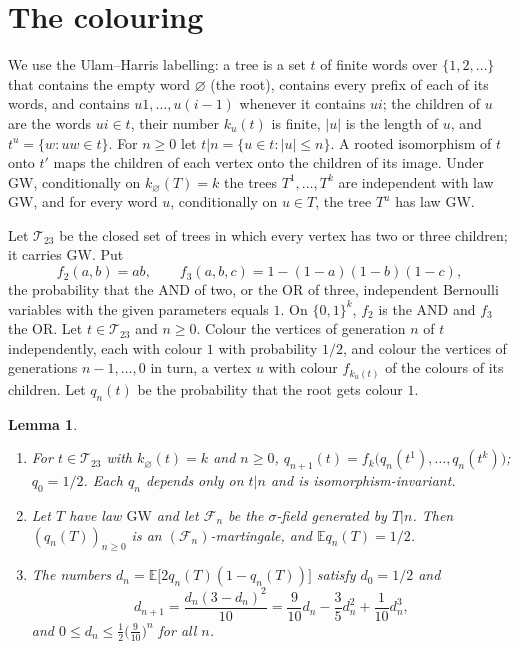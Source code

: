 \documentclass[11pt]{amsart}
\newtheorem{lemma}{Lemma}
\theoremstyle{remark}
\numberwithin{equation}{section}
\newcommand{\E}{\mathbb E}
\newcommand{\T}{\mathcal T}
\newcommand{\GW}{\mathrm{GW}}
\begin{document}
\section{The colouring}\label{sec:colour}

We use the Ulam--Harris labelling: a tree is a set $t$ of finite words over $\{1,2,\dots\}$ that contains the empty word $\varnothing$ (the root), contains every prefix of each of its words, and contains $u1,\dots,u(i-1)$ whenever it contains $ui$; the children of $u$ are the words $ui\in t$, their number $k_u(t)$ is finite, $|u|$ is the length of $u$, and $t^u=\{w:uw\in t\}$. For $n\ge0$ let $t|n=\{u\in t:|u|\le n\}$. A rooted isomorphism of $t$ onto $t'$ maps the children of each vertex onto the children of its image. Under $\GW$, conditionally on $k_\varnothing(T)=k$ the trees $T^1,\dots,T^k$ are independent with law $\GW$, and for every word $u$, conditionally on $u\in T$, the tree $T^u$ has law $\GW$.

Let $\T_{23}$ be the closed set of trees in which every vertex has two or three children; it carries $\GW$. Put
\[
f_2(a,b)=ab,\qquad f_3(a,b,c)=1-(1-a)(1-b)(1-c),
\]
the probability that the AND of two, or the OR of three, independent Bernoulli variables with the given parameters equals $1$. On $\{0,1\}^k$, $f_2$ is the AND and $f_3$ the OR. Let $t\in\T_{23}$ and $n\ge0$. Colour the vertices of generation $n$ of $t$ independently, each with colour $1$ with probability $1/2$, and colour the vertices of generations $n-1,\dots,0$ in turn, a vertex $u$ with colour $f_{k_u(t)}$ of the colours of its children. Let $q_n(t)$ be the probability that the root gets colour $1$.

\begin{lemma}\label{lem:q}
\begin{enumerate}[label=\textup{(\alph*)}]
\item For $t\in\T_{23}$ with $k_\varnothing(t)=k$ and $n\ge0$, $q_{n+1}(t)=f_k\bigl(q_n(t^1),\dots,q_n(t^k)\bigr)$; $q_0=1/2$. Each $q_n$ depends only on $t|n$ and is isomorphism-invariant.
\item Let $T$ have law $\GW$ and let $\mathcal F_n$ be the $\sigma$-field generated by $T|n$. Then $(q_n(T))_{n\ge0}$ is an $(\mathcal F_n)$-martingale, and $\E q_n(T)=1/2$.
\item The numbers $d_n=\E\bigl[2q_n(T)(1-q_n(T))\bigr]$ satisfy $d_0=1/2$ and
\begin{equation}\label{eq:rec}
d_{n+1}=\frac{d_n(3-d_n)^2}{10}=\frac9{10}d_n-\frac35d_n^2+\frac1{10}d_n^3 ,
\end{equation}
and $0\le d_n\le\frac12\bigl(\frac9{10}\bigr)^n$ for all $n$.
\end{enumerate}
\end{lemma}
\end{document}
